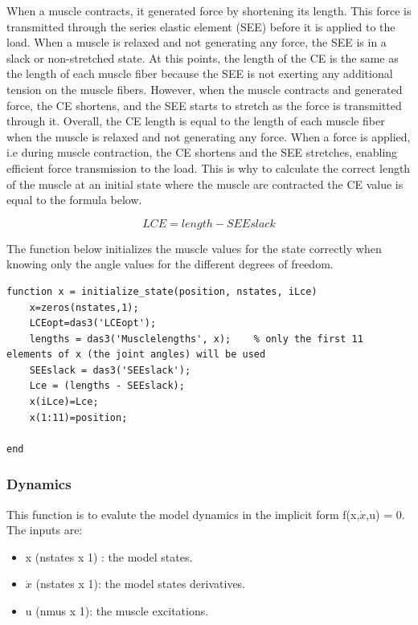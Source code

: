 When a muscle contracts, it generated force by shortening its length. This force is transmitted through the series elastic element (SEE) before it is applied to the load. When a muscle is relaxed and not generating any force, the SEE is in a slack or non-stretched state. At this points, the length of the CE is the same as the length of each muscle fiber because the SEE is not exerting any additional tension on the muscle fibers. However, when the muscle contracts and generated force, the CE shortens, and the SEE starts to stretch as the force is transmitted through it. 
Overall, the CE length is equal to the length of each muscle fiber when the muscle is relaxed and not generating any force. When a force is applied, i.e during muscle contraction, the CE shortens and the SEE stretches, enabling efficient force transmission to the load. This is why to calculate the correct length of the muscle at an initial state where the muscle are contracted the CE value is equal to the formula below.

\begin{equation}
    LCE = length - SEEslack \label{LCE}
\end{equation}

The function below initializes the muscle values for the state correctly when knowing only the angle values for the different degrees of freedom.

\begin{lstlisting}
function x = initialize_state(position, nstates, iLce)
    x=zeros(nstates,1);
    LCEopt=das3('LCEopt');
    lengths = das3('Musclelengths', x);    % only the first 11 elements of x (the joint angles) will be used
    SEEslack = das3('SEEslack');
    Lce = (lengths - SEEslack);
    x(iLce)=Lce;
    x(1:11)=position;

end
\end{lstlisting}

\subsubsection{Dynamics}
This function is to evalute the model dynamics in the implicit form f(x,$\dot{x}$,u) = 0.
The inputs are:
\begin{itemize}
    \item x (nstates x 1) : the model states.
    \item $\dot{x}$ (nstates x 1): the model states derivatives.
    \item u (nmus x 1): the muscle excitations.
\end{itemize}

